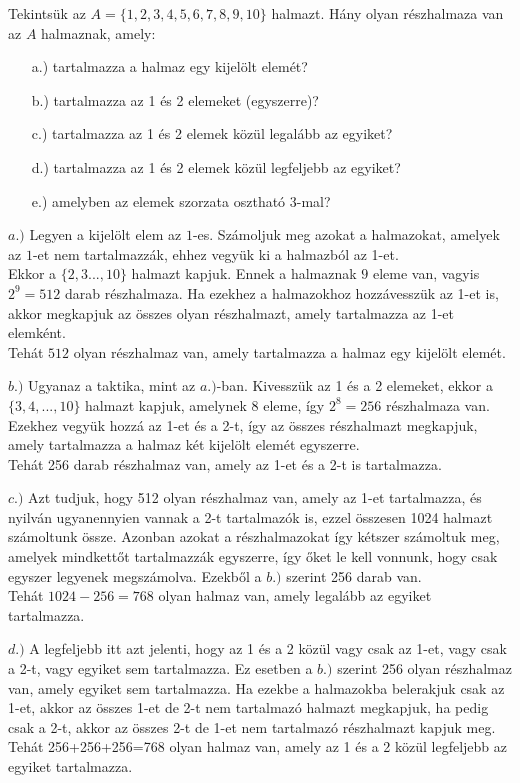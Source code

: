 \begin{problem}
	Tekintsük az $A=\{1,2,3,4,5,6,7,8,9,10\}$ halmazt. Hány olyan részhalmaza
	van az $A$ halmaznak, amely: 
	\begin{enumerate}
		\item[a.)] tartalmazza a halmaz egy kijelölt elemét? 
		\item[b.)] tartalmazza az 1 és 2 elemeket (egyszerre)? 
		\item[c.)] tartalmazza az 1 és 2 elemek közül legalább az egyiket? 
		\item[d.)] tartalmazza az 1 és 2 elemek közül legfeljebb az egyiket? 
		\item[e.)] amelyben az elemek szorzata osztható 3-mal? 
	\end{enumerate}
\end{problem}
\begin{solution}
	$a.)$ Legyen a kijelölt elem az $1$-es. Számoljuk meg azokat a halmazokat,
	amelyek az $1$-et nem tartalmazzák, ehhez vegyük ki a halmazból az
	1-et. \\
	Ekkor a $\{2,3...,10\}$ halmazt kapjuk. Ennek a halmaznak $9$ eleme
	van, vagyis $2^{9}=512$ darab részhalmaza. Ha ezekhez a halmazokhoz
	hozzávesszük az 1-et is, akkor megkapjuk az összes olyan részhalmazt,
	amely tartalmazza az 1-et elemként. \\
	Tehát $512$ olyan részhalmaz van, amely tartalmazza a halmaz egy
	kijelölt elemét.
	
	$b.)$ Ugyanaz a taktika, mint az $a.)$-ban. Kivesszük az 1 és a
	2 elemeket, ekkor a $\{3,4,...,10\}$ halmazt kapjuk, amelynek 8 eleme,
	így $2^{8}=256$ részhalmaza van. Ezekhez vegyük hozzá az 1-et és
	a 2-t, így az összes részhalmazt megkapjuk, amely tartalmazza a halmaz
	két kijelölt elemét egyszerre. \\
	Tehát 256 darab részhalmaz van, amely az 1-et és a 2-t is tartalmazza.
	
	$c.)$ Azt tudjuk, hogy 512 olyan részhalmaz van, amely az 1-et tartalmazza,
	és nyilván ugyanennyien vannak a 2-t tartalmazók is, ezzel összesen
	1024 halmazt számoltunk össze. Azonban azokat a részhalmazokat így
	kétszer számoltuk meg, amelyek mindkettőt tartalmazzák egyszerre,
	így őket le kell vonnunk, hogy csak egyszer legyenek megszámolva.
	Ezekből a $b.)$ szerint 256 darab van.\\
	Tehát $1024-256=768$ olyan halmaz van, amely legalább az egyiket
	tartalmazza.
	
	$d.)$ A legfeljebb itt azt jelenti, hogy az 1 és a 2 közül vagy csak
	az 1-et, vagy csak a 2-t, vagy egyiket sem tartalmazza. Ez esetben
	a $b.)$ szerint 256 olyan részhalmaz van, amely egyiket sem tartalmazza.
	Ha ezekbe a halmazokba belerakjuk csak az 1-et, akkor az összes 1-et
	de 2-t nem tartalmazó halmazt megkapjuk, ha pedig csak a 2-t, akkor
	az összes 2-t de 1-et nem tartalmazó részhalmazt kapjuk meg. \\
	Tehát 256+256+256=768 olyan halmaz van, amely az 1 és a 2 közül legfeljebb
	az egyiket tartalmazza.
	

\end{solution}
